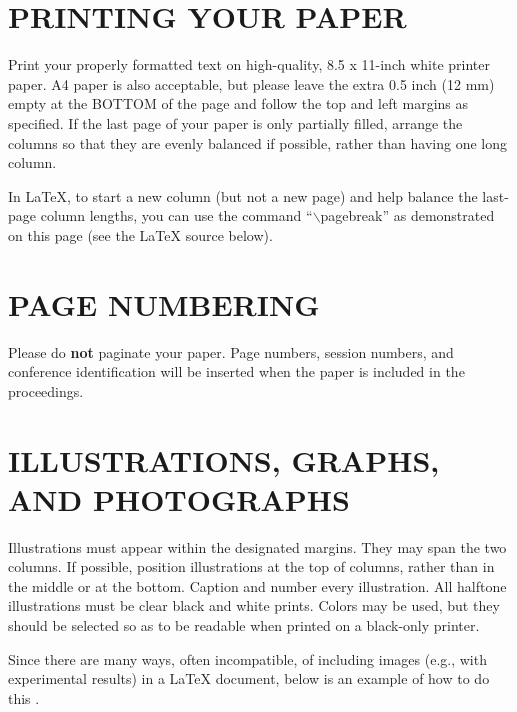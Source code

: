 \documentclass{article}
\begin{document}
\section{PRINTING YOUR PAPER}
\label{sec:print}

Print your properly formatted text on high-quality, 8.5 x 11-inch white printer
paper. A4 paper is also acceptable, but please leave the extra 0.5 inch (12 mm)
empty at the BOTTOM of the page and follow the top and left margins as
specified.  If the last page of your paper is only partially filled, arrange
the columns so that they are evenly balanced if possible, rather than having
one long column.

In LaTeX, to start a new column (but not a new page) and help balance the
last-page column lengths, you can use the command ``$\backslash$pagebreak'' as
demonstrated on this page (see the LaTeX source below).

\section{PAGE NUMBERING}
\label{sec:page}

Please do {\bf not} paginate your paper.  Page numbers, session numbers, and
conference identification will be inserted when the paper is included in the
proceedings.

\section{ILLUSTRATIONS, GRAPHS, AND PHOTOGRAPHS}
\label{sec:illust}

Illustrations must appear within the designated margins.  They may span the two
columns.  If possible, position illustrations at the top of columns, rather
than in the middle or at the bottom.  Caption and number every illustration.
All halftone illustrations must be clear black and white prints.  Colors may be
used, but they should be selected so as to be readable when printed on a
black-only printer.

Since there are many ways, often incompatible, of including images (e.g., with
experimental results) in a LaTeX document, below is an example of how to do
this \cite{Lamp86}.
\end{document}

